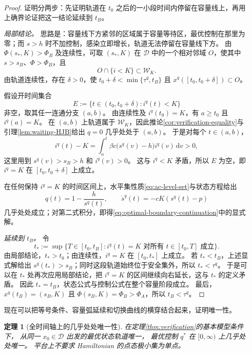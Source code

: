 \documentclass[11pt,a4paper,UTF8]{ctexart}
\newtheorem{theorem}{定理}[section]
\theoremstyle{definition}
\newcommand{\Dcal}{\mathcal D}
\newcommand{\dd}{\,\mathrm d}
\begin{document}
\begin{proof}
证明分两步：先证明轨道在 $t_0$ 之后的一小段时间内停留在容量线上，再用上确界论证把这一结论延续到 $t_B$。

\emph{局部结论。}
思路是：容量线下方紧邻的区域属于容量等待区，最优控制在那里为零；而 $s>h$ 时不加控制，感染立即增长，轨道无法停留在容量线下方。
由 $\Phi(s_*,K)>\Phi_B$ 及连续性，可取 $(s_*,K)$ 在 $\Dcal$ 中的一个相对邻域 $O$，使其中 $s>s_B$、$\Phi>\Phi_B$，且
\[
O\cap\{i<K\}\subset\mathcal W_K.
\]
由轨道连续性，存在 $\delta>0$，使 $t_0+\delta<\min\{\tau^q,t_B\}$ 且 $x^q([t_0,t_0+\delta])\subset O$。

假设开时间集合
\[
E:=\{t\in(t_0,t_0+\delta):i^q(t)<K\}
\]
非空，取其任一连通分支 $(a,b)$。
由连续性及 $i^q(t_0)=K$，有 $a\ge t_0$ 且 $i^q(a)=K$。
在 $(a,b)$ 上轨道属于 $\mathcal W_K$，因此推论\ref{cor:verification-equality}与引理\ref{lem:waiting-HJB}给出 $q=0$ 几乎处处于 $(a,b)$。
于是对每个 $t\in(a,b)$，
\[
i^q(t)-K
=\int_a^t \beta c\bigl(s^q(v)-h\bigr)i^q(v)\dd v>0,
\]
这里用到 $s^q(v)>s_B>h$ 和 $i^q(v)>0$。
这与 $i^q<K$ 矛盾，所以 $E$ 为空，即 $i^q=K$ 在 $[t_0,t_0+\delta]$ 上成立。

在任何保持 $i^q=K$ 的时间区间上，水平集性质\eqref{eq:ac-level-set}与状态方程给出
\[
q(t)=1-\frac{h}{s^q(t)},\qquad
\dot s^q(t)=-cK(s^q(t)-p)
\]
几乎处处成立；对第二式积分，即得\eqref{eq:optimal-boundary-continuation}中的显式解。

\emph{延续到 $t_B$。}
令
\[
t_*:=\sup\{T\in[t_0,t_B]:
 i^q(t)=K\text{ 对所有 }t\in[t_0,T]\text{ 成立}\}.
\]
由局部结论，$t_*>t_0$；由连续性，$i^q=K$ 在 $[t_0,t_*]$ 上成立。
若 $t_*<t_B$，上述显式解给出 $s^q(t_*)>s_B$；同时这段轨道始终位于安全集外，所以 $t_*<\tau^q$。
于是可以在 $t_*$ 处再次应用局部结论，把 $i^q=K$ 的区间继续向右延长，这与 $t_*$ 的定义矛盾。
因此 $t_*=t_B$，状态公式与控制公式在整个容量阶段成立。
最后，$x^q(t_B)=(s_B,K)$ 且 $\Phi(s_B,K)=\Phi_B>\Phi_A$，所以 $t_B<\tau^q$。
\end{proof}

现在可以把等号条件、容量弧延续和切换曲线的横穿结合起来，证明唯一性。

\begin{theorem}[全时间轴上的几乎处处唯一性]
\label{thm:unique-q}
在定理\ref{thm:verification}的基本模型条件下，
从同一 $x_0\in\Dcal$ 出发的最优状态轨道唯一，
最优控制 $q^*$ 在 $[0,\infty)$ 上几乎处处唯一。
平台上不要求 Hamiltonian 的点态极小集为单点。
\end{theorem}
\end{document}
